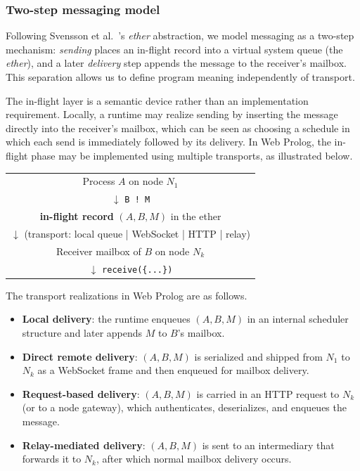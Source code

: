 \subsubsection{Two-step messaging model}
Following Svensson et al.~\cite{conf/erlang/SvenssonFE10}'s \emph{ether}
abstraction, we model messaging as a two-step mechanism:
\emph{sending} places an in-flight record into a virtual system
queue (the \emph{ether}), and a later \emph{delivery} step appends
the message to the receiver's mailbox. This separation allows us to
define program meaning independently of transport.

The in-flight layer is a semantic device rather than an
implementation requirement. Locally, a runtime may realize sending
by inserting the message directly into the receiver's mailbox, which
can be seen as choosing a schedule in which each send is immediately
followed by its delivery. In Web Prolog, the in-flight phase may be
implemented using multiple transports, as illustrated below.

\begin{center}
\begin{tabular}{c}
Process $A$ on node $N_1$ \\
$\downarrow$ \quad \texttt{B ! M} \\
\textbf{in-flight record} $(A, B, M)$ in the ether \\
$\downarrow$ \quad (transport: local queue \;|\; WebSocket \;|\; HTTP \;|\; relay) \\
Receiver mailbox of $B$ on node $N_k$ \\
$\downarrow$ \quad \texttt{receive(\{...\})}
\end{tabular}
\end{center}

\noindent The transport realizations in Web Prolog are as follows.

\begin{itemize}
\item \textbf{Local delivery}: the runtime enqueues $(A,B,M)$ in an
internal scheduler structure and later appends $M$ to $B$'s mailbox.
\item \textbf{Direct remote delivery}: $(A,B,M)$ is serialized and
shipped from $N_1$ to $N_k$ as a WebSocket frame and then enqueued
for mailbox delivery.
\item \textbf{Request-based delivery}: $(A,B,M)$ is carried in an
HTTP request to $N_k$ (or to a node gateway), which authenticates,
deserializes, and enqueues the message.
\item \textbf{Relay-mediated delivery}: $(A,B,M)$ is sent to an
intermediary that forwards it to $N_k$, after which normal mailbox
delivery occurs.
\end{itemize}

